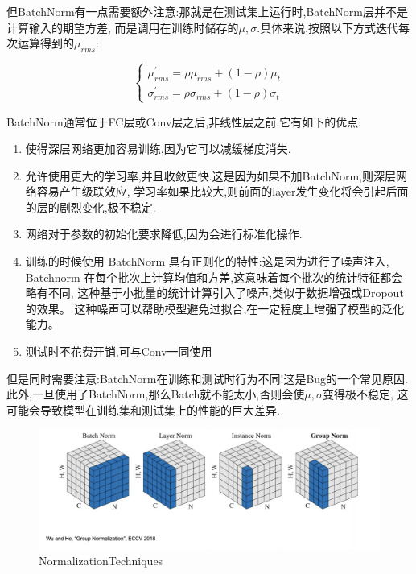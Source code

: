 但BatchNorm有一点需要额外注意:那就是在测试集上运行时,BatchNorm层并不是计算输入的期望方差,
而是调用在训练时储存的$\mu, \sigma$.具体来说,按照以下方式迭代每次运算得到的$\mu_{rms}$:

\begin{equation}
	\begin{cases}
		\mu_{rms}^\prime = \rho \mu_{rms} + (1-\rho) \mu_t 
		\\
		\sigma_{rms}^\prime = \rho \sigma_{rms} + (1-\rho) \sigma_t 
	\end{cases}
\end{equation}

BatchNorm通常位于FC层或Conv层之后,非线性层之前.它有如下的优点:

\begin{enumerate}
	\item 使得深层网络更加容易训练,因为它可以减缓梯度消失.
	\item 允许使用更大的学习率,并且收敛更快.这是因为如果不加BatchNorm,则深层网络容易产生级联效应,
	学习率如果比较大,则前面的layer发生变化将会引起后面的层的剧烈变化,极不稳定.
	\item 网络对于参数的初始化要求降低,因为会进行标准化操作.
	\item 训练的时候使用 BatchNorm 具有正则化的特性:这是因为进行了噪声注入,
	Batchnorm 在每个批次上计算均值和方差,这意味着每个批次的统计特征都会略有不同,
	这种基于小批量的统计计算引入了噪声,类似于数据增强或Dropout的效果。
	这种噪声可以帮助模型避免过拟合,在一定程度上增强了模型的泛化能力。
	\item 测试时不花费开销,可与Conv一同使用
\end{enumerate}

但是同时需要注意:BatchNorm在训练和测试时行为不同!这是Bug的一个常见原因.
此外,一旦使用了BatchNorm,那么Batch就不能太小,否则会使$\mu, \sigma$变得极不稳定,
这可能会导致模型在训练集和测试集上的性能的巨大差异.

\begin{figure}[htbp]
	\centering
	\includegraphics[scale=0.55]{figures/NormalizationTechniques.png}
	\caption{NormalizationTechniques}
	\label{fournorm}
\end{figure}

